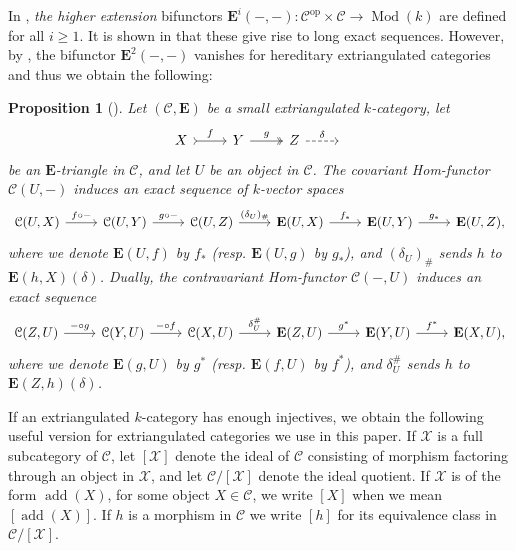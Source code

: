 \documentclass[10pt,twoside, a4paper,reqno]{amsart}
\DeclareMathOperator{\add}{add}
\newcommand{\op}{^{\mathrm{op}}}
\DeclareMathOperator{\Mod}{Mod}
\newcommand{\calC}{\mathcal{C}}
\newcommand{\E}{\mathbf{E}}
\newtheorem{proposition}[theorem]{Proposition}
\theoremstyle{definition}
\begin{document}
In \cite{GNP21}, \textit{the higher extension} bifunctors $\E^i(-,-): \calC\op \times \calC \to \Mod(k)$ are defined for all $i \geq 1$. It is shown in \cite[Thm. 3.5]{GNP21} that these give rise to long exact sequences. However, by \cite[Prop. 2.1(1)(iii)]{GNP23}, the bifunctor $\E^2(-,-)$ vanishes for hereditary extriangulated categories and thus we obtain the following:

\begin{proposition}[{\cite[Cor. 3.12]{NP19}}]
    \label{lem:LES}
    Let $(\calC,\E)$ be a small extriangulated $k$-category, let 
   	\[ \begin{tikzcd}
			X \arrow[r,tail, "f"] & Y \arrow[r,two heads, "g"] & Z\arrow[r,dashed, "\delta"] & {}
	\end{tikzcd} 
	\]
	be an $\E$-triangle in $\calC$, and let $U$ be an object in $\calC$. The covariant Hom-functor $\calC(U,-)$ induces an exact sequence of $k$-vector spaces
    \begin{equation*}
    \begin{tikzcd}
        \calC(U,X) \arrow[r, "f \circ -"] & \calC(U,Y) \arrow[r, "g \circ -"] & \calC(U,Z) \arrow[r, "(\delta_U)_{\#}"]  &  \E(U,X) \arrow[r, "f_*"] & \E(U,Y) \arrow[r, "g_*"] & \E(U,Z),
        \end{tikzcd}
    \end{equation*}
    where we denote $\E(U,f)$ by $f_*$ (resp. $\E(U,g)$ by $g_*$), and $(\delta_U)_{\#}$ sends $h$ to $\E(h,X)(\delta)$.
    Dually, the contravariant Hom-functor $\calC(-,U)$ induces an exact sequence    
    \begin{equation*}
    \begin{tikzcd}
        \calC(Z,U) \arrow[r, "- \circ g"] & \calC(Y,U) \arrow[r, "- \circ f"] &\calC(X,U) \arrow[r, "\delta_U^{\#}"] & \E(Z,U) \arrow[r, "g^*"] & \E(Y,U) \arrow[r, "f^*"] & \E(X,U),
        \end{tikzcd}
    \end{equation*}
    where we denote $\E(g,U)$ by $g^*$ (resp. $\E(f,U)$ by $f^*$), and $\delta_U^{\#}$ sends $h$ to $\E(Z,h)(\delta)$.
\end{proposition}

If an extriangulated $k$-category has enough injectives, we obtain the following useful version for extriangulated categories we use in this paper. If $\mathcal{X}$ is a full subcategory of $\calC$, let $[\mathcal{X}]$ denote the ideal of $\calC$ consisting of morphism factoring through an object in $\mathcal{X}$, and let $\calC/[\mathcal{X}]$ denote the ideal quotient.  If $\mathcal{X}$ is of the form $\add(X)$, for some object $X\in \calC$, we write $[X]$ when we mean $[\add(X)]$. If $h$ is a morphism in $\calC$ we write $[h]$ for its equivalence class in $\calC/[\mathcal{X}]$.
\end{document}
